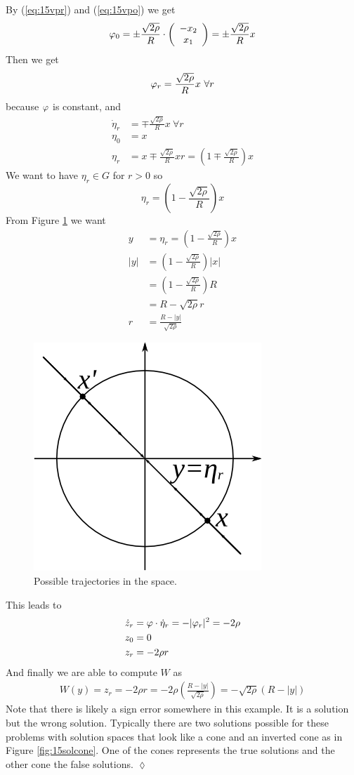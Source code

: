 \begin{example}
By (\ref{eq:15vpr}) and (\ref{eq:15vpo}) we get
$$\varphi_0 = \pm\frac{\sqrt{2\rho}}{R}\cdot\left(\begin{array}{c} -x_2 \\ x_1 \end{array}\right) = \pm\frac{\sqrt{2\rho}}{R}x$$
Then we get
$$\varphi_r = \frac{\sqrt{2\rho}}{R}x ~\forall r$$
because $\varphi$ is constant, and
\begin{align*}
\dot{\eta}_r &= \mp \frac{\sqrt{2\rho}}{R}x ~\forall r \\
\eta_0 &= x \\
\eta_r &= x\mp\frac{\sqrt{2\rho}}{R}xr = \left(1\mp\frac{\sqrt{2\rho}}{R}\right)x
\end{align*}
We want to have $\eta_r\in G$ for $r>0$ so
$$\eta_r = \left(1-\frac{\sqrt{2\rho}}{R}\right)x$$
From Figure \ref{fig:15traj} we want
\begin{align*}
y &= \eta_r = \left(1-\frac{\sqrt{2\rho}}{R}\right)x \\
|y| &= \left(1-\frac{\sqrt{2\rho}}{R}\right)|x| \\
&= \left(1-\frac{\sqrt{2\rho}}{R}\right)R \\
&= R-\sqrt{2\rho}r \\
r &= \frac{R-|y|}{\sqrt{2\rho}}
\end{align*}

\begin{figure}[ht!]
	\centering
	\includegraphics[width=.2\textwidth]{images/15traj}
	\caption{Possible trajectories in the space.}
	\label{fig:15traj}
\end{figure}

This leads to
\begin{align*}
\dot{z}_r &= \varphi\cdot\dot{\eta}_r = -|\varphi_r|^2 = -2\rho \\
z_0 &= 0 \\
z_r &= -2\rho r
\end{align*}
And finally we are able to compute $W$ as
\begin{align*}
\boxed{W(y) = z_r = -2\rho r = -2\rho\left(\frac{R-|y|}{\sqrt{2\rho}}\right) = -\sqrt{2\rho}(R-|y|)}
\end{align*}
Note that there is likely a sign error somewhere in this example. It is a solution but the wrong solution. Typically there are two solutions possible for these problems with solution spaces that look like a cone and an inverted cone as in Figure \ref{fig:15solcone}. One of the cones represents the true solutions and the other cone the false solutions.
$\lozenge$
\end{example}

